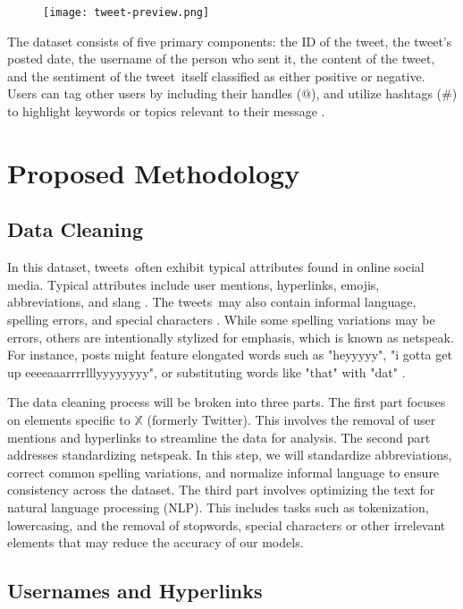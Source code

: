 \documentclass{article}
\newcommand{\twitter}{$\mathbb{X}$ (formerly Twitter)}
\newcommand{\tweets}{tweets}
\newcommand{\tweet}{tweet}
\begin{document}
\begin{multicols}{2}
\begin{figure}[H]
\centering
\texttt{[image: tweet-preview.png]}
\label{fig:sample_tweet}
\end{figure}

The dataset consists of five primary components: the ID of the \tweet, the \tweet's posted date, the username of the person who sent it, the content of the \tweet, and the sentiment of the \tweet\ itself classified as either positive or negative. Users can tag other users by including their handles (@), and utilize hashtags (\#) to highlight keywords or topics relevant to their message \cite{metricool2024}.

\section{Proposed Methodology}

\subsection{Data Cleaning}  

In this dataset, \tweets\ often exhibit typical attributes found in online social media. Typical attributes include user mentions, hyperlinks, emojis, abbreviations, and slang \cite{inproceedings}. The \tweets\ may also contain informal language, spelling errors, and special characters \cite{DBLP:journals/corr/DhingraZFMC16}. While some spelling variations may be errors, others are intentionally stylized for emphasis, which is known as netspeak. For instance, posts might feature elongated words such as "heyyyyy", "i gotta get up eeeeaaarrrrlllyyyyyyyy", or substituting words like "that" with "dat" \cite{thangaraj2015influence}. 

The data cleaning process will be broken into three parts. The first part focuses on elements specific to \twitter. This involves the removal of user mentions and hyperlinks to streamline the data for analysis. The second part addresses standardizing netspeak. In this step, we will standardize abbreviations, correct common spelling variations, and normalize informal language to ensure consistency across the dataset. The third part involves optimizing the text for natural language processing (NLP). This includes tasks such as tokenization, lowercasing, and the removal of stopwords, special characters or other irrelevant elements that may reduce the accuracy of our models.

\subsection{Usernames and Hyperlinks}   


\end{multicols}
\end{document}
